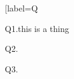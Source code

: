 \documentclass[12pt]{report}
\begin{document}
\begin{enumerate}[label=Q\arabic*\]  
  \item Q1.this is a thing
  \item Q2.
  \item Q3.
\end{enumerate}
\end{document}
